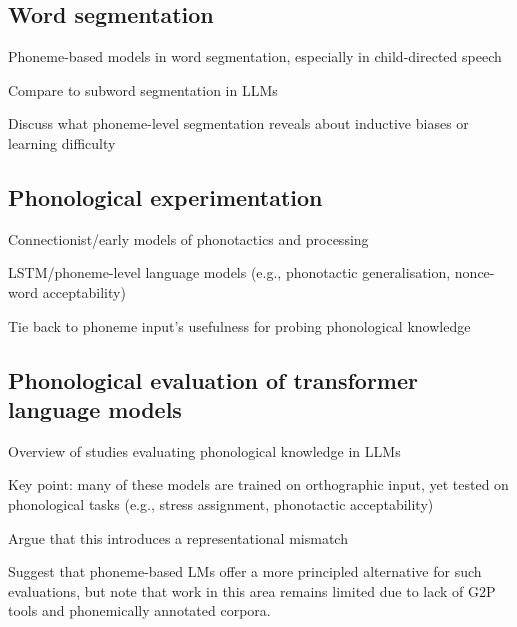 \subsection{Word segmentation}
Phoneme-based models in word segmentation, especially in child-directed speech

Compare to subword segmentation in LLMs

Discuss what phoneme-level segmentation reveals about inductive biases or learning difficulty

\subsection{Phonological experimentation}



Connectionist/early models of phonotactics and processing

LSTM/phoneme-level language models (e.g., phonotactic generalisation, nonce-word acceptability)

Tie back to phoneme input’s usefulness for probing phonological knowledge

\subsection{Phonological evaluation of transformer language models}

Overview of studies evaluating phonological knowledge in LLMs

Key point: many of these models are trained on orthographic input, yet tested on phonological tasks (e.g., stress assignment, phonotactic acceptability)

Argue that this introduces a representational mismatch

Suggest that phoneme-based LMs offer a more principled alternative for such evaluations, but note that work in this area remains limited due to lack of G2P tools and phonemically annotated corpora.



